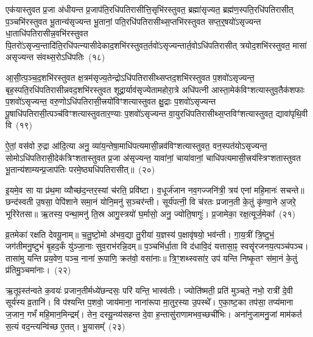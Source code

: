 एक॑यास्तुवत प्र॒जा अ॑धीयन्त प्र॒जा\-प॑ति॒रधि॑पतिरासीत्ति॒सृभि॑रस्तुवत॒ ब्रह्मा॑सृज्यत॒ ब्रह्म॑ण॒स्पति॒रधि॑पतिरासीत् प॒ञ्चभि॑रस्तुवत भू॒तान्य॑सृज्यन्त भू॒तानां॒ पति॒रधि॑पतिरासीथ्स॒प्तभि॑रस्तुवत सप्त॒र्॒\mbox{}षयो॑\-ऽसृज्यन्त धा॒ताधि॑पतिरा\-सीन्न॒वभि॑रस्तुवत पि॒तरो॑\-ऽसृज्य॒न्तादि॑ति॒रधि॑पत्न्यासीदेकाद॒शभि॑रस्तुवत॒र्तवो॑\-ऽसृज्यन्तार्त॒वो\-ऽधि॑पतिरासीत् त्रयोद॒शभि॑रस्तुवत॒ मासा॑ असृज्यन्त संवथ्स॒रो\-ऽधि॑पतिः~(१८)

आ॒सी॒त्प॒ञ्च॒द॒शभि॑रस्तुवत क्ष॒त्रम॑सृज्य॒तेन्द्रो\-ऽधि॑पतिरासीथ्सप्तद॒शभि॑रस्तुवत प॒शवो॑\-ऽसृज्यन्त॒ बृह॒स्पति॒रधि॑पतिरासी\-न्नवद॒शभि॑रस्तुवत शूद्रा॒र्याव॑सृज्येतामहोरा॒त्रे अधि॑पत्नी आस्ता॒मेक॑विꣳशत्यास्तुव॒तैक॑शफाः प॒शवो॑\-ऽसृज्यन्त॒ वरु॒णो\-ऽधि॑पतिरासी॒त्त्रयो॑विꣳशत्यास्तुवत क्षु॒द्राः प॒शवो॑\-ऽसृज्यन्त पू॒षाधि॑पतिरासी॒त्पञ्च॑विꣳशत्यास्तुवतार॒ण्याः प॒शवो॑\-ऽसृज्यन्त वा॒युरधि॑पतिरासीथ्स॒प्तविꣳ॑शत्यास्तुवत॒ द्यावा॑पृथि॒वी वि~(१९)

ऐ॒तां॒ वस॑वो रु॒द्रा आ॑दि॒त्या अनु॒ व्या॑य॒न्तेषा॒माधि॑पत्यमासी॒न्नव॑विꣳशत्यास्तुवत॒ वन॒स्पत॑यो\-ऽसृज्यन्त॒ सोमो\-ऽ\-धि॑पतिरासी॒देक॑त्रिꣳशतास्तुवत प्र॒जा अ॑सृज्यन्त॒ यावा॑नां॒ चाया॑वानां॒ चाधि॑पत्यमासी॒त्त्रय॑स्त्रिꣳशतास्तुवत भू॒तान्य॑शाम्यन्प्र॒जा\-प॑तिः परमे॒ष्ठ्यधि॑पतिरासीत्॥~(२०)

{\anuvakamend[{सं॒ व॒थ्स॒रो\-ऽधि॑पति॒र्वि पञ्च॑त्रिꣳशच्च}]}%

इ॒यमे॒व सा या प्र॑थ॒मा व्यौच्छ॑द॒न्तर॒स्यां च॑रति॒ प्रवि॑ष्टा। व॒धूर्ज॑जान नव॒गज्जनि॑त्री॒ त्रय॑ एनां महि॒मानः॑ सचन्ते॥ छन्द॑स्वती उ॒षसा॒ पेपि॑शाने समा॒नं योनि॒मनु॑ स॒ञ्चर॑न्ती। सूर्य॑पत्नी॒ वि च॑रतः प्रजान॒ती के॒तुं कृ॑ण्वा॒ने अ॒जरे॒ भूरि॑रेतसा॥ ऋ॒तस्य॒ पन्था॒मनु॑ ति॒स्र आगु॒स्त्रयो॑ घ॒र्मासो॒ अनु॒ ज्योति॒षागुः॑। प्र॒जामेका॒ रक्ष॒त्यूर्ज॒मेका᳚~(२१)

व्र॒तमेका॑ रक्षति देवयू॒नाम्॥ च॒तु॒ष्टो॒मो अ॑भव॒द्या तु॒रीया॑ य॒ज्ञस्य॑ प॒क्षावृ॑षयो॒ भव॑न्ती। गा॒य॒त्रीं त्रि॒ष्टुभं॒ जग॑तीमनु॒ष्टुभं॑ बृ॒हद॒र्कं यु॑ञ्जा॒नाः सुव॒राभ॑रन्नि॒दम्॥ प॒ञ्चभि॑र्धा॒ता वि द॑धावि॒दं यत्तासा॒ꣴ॒ स्वसॄ॑रजनय॒त्पञ्च॑पञ्च। तासा॑मु यन्ति प्रय॒वेण॒ पञ्च॒ नाना॑ रू॒पाणि॒ क्रत॑वो॒ वसा॑नाः॥ त्रि॒ꣳ॒शथ्स्वसा॑र॒ उप॑ यन्ति निष्कृ॒तꣳ स॑मा॒नं के॒तुं प्र॑तिमु॒ञ्चमा॑नाः।~(२२)

ऋ॒तूꣴस्त॑न्वते क॒वयः॑ प्रजान॒तीर्मध्ये॑छन्दसः॒ परि॑ यन्ति॒ भास्व॑तीः। ज्योति॑ष्मती॒ प्रति॑ मुञ्चते॒ नभो॒ रात्री॑ दे॒वी सूर्य॑स्य व्र॒तानि॑। वि प॑श्यन्ति प॒शवो॒ जाय॑माना॒ नाना॑रूपा मा॒तुर॒स्या उ॒पस्थे᳚। ए॒का॒ष्ट॒का तप॑सा॒ तप्य॑माना ज॒जान॒ गर्भं॑ महि॒मान॒मिन्द्रम्᳚। तेन॒ दस्यू॒न्व्य॑सहन्त दे॒वा ह॒न्तासु॑राणामभव॒च्छची॑भिः। अना॑नुजामनु॒जां माम॑कर्त स॒त्यं वद॒न्त्यन्वि॑च्छ ए॒तत्। भू॒यासम्᳚~(२३)

